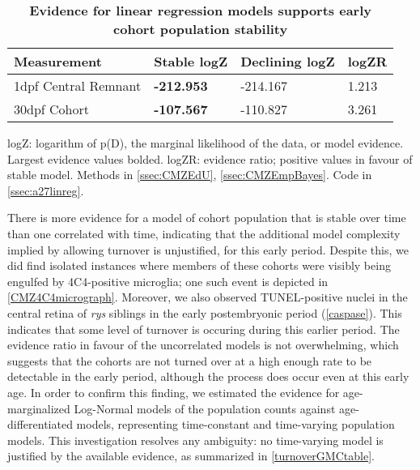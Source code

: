 \begin{table}[!ht]
    \centering
    \caption{{\bf Evidence for linear regression models supports early cohort population stability}}
    \begin{tabular}{|l|l|l|l|}
    \hline
    {\bf Measurement} & {\bf Stable logZ} & {\bf Declining logZ} & {\bf logZR}\\ \hline
    1dpf Central Remnant & {\bf -212.953} & -214.167 & 1.213\\ \hline    
    30dpf Cohort & {\bf -107.567} & -110.827 & 3.261\\ \hline
    \end{tabular}
   
    \begin{flushleft}logZ: logarithm of p(D), the marginal likelihood of the data, or model evidence.  Largest evidence values bolded. logZR: evidence ratio; positive values in favour of stable model.
    Methods in \autoref{ssec:CMZEdU}, \autoref{ssec:CMZEmpBayes}.
    Code in \autoref{ssec:a27linreg}.
    \end{flushleft}
    \label{turnovertable}
\end{table}

There is more evidence for a model of cohort population that is stable over time than one correlated with time, indicating that the additional model complexity implied by allowing turnover is unjustified, for this early period. Despite this, we did find isolated instances where members of these cohorts were visibly being engulfed by 4C4-positive microglia; one such event is depicted in \autoref{CMZ4C4micrograph}. Moreover, we also observed TUNEL-positive nuclei in the central retina of \textit{rys} siblings in the early postembryonic period (\autoref{caspase}). This indicates that some level of turnover is occuring during this earlier period. The evidence ratio in favour of the uncorrelated models is not overwhelming, which suggests that the cohorts are not turned over at a high enough rate to be detectable in the early period, although the process does occur even at this early age. In order to confirm this finding, we estimated the evidence for age-marginalized Log-Normal models of the population counts against age-differentiated models, representing time-constant and time-varying population models. This investigation resolves any ambiguity: no time-varying model is justified by the available evidence, as summarized in \autoref{turnoverGMCtable}.

